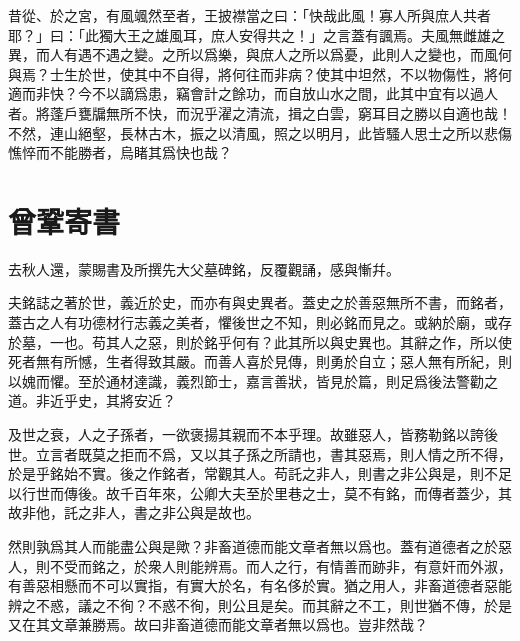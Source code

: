 昔從、於之宮，有風颯然至者，王披襟當之曰：「快哉此風！寡人所與庶人共者耶？」曰：「此獨大王之雄風耳，庶人安得共之！」之言蓋有諷焉。夫風無雌雄之異，而人有遇不遇之變。之所以爲樂，與庶人之所以爲憂，此則人之變也，而風何與焉？士生於世，使其中不自得，將何往而非病？使其中坦然，不以物傷性，將何適而非快？今不以謫爲患，{竊會計之餘功}，而自放山水之間，此其中宜有以過人者。將蓬戶甕牖無所不快，而況乎濯之清流，{揖}之白雲，窮耳目之勝以自適也哉！不然，連山絕壑，長林古木，振之以清風，照之以明月，此皆騷人思士之所以悲傷憔悴而不能勝者，烏睹其爲快也{哉}？ %

\theendnotes

\section[寄歐陽舍人書\quad{\small 曾鞏}]{{\normalsize 曾鞏}\quad 寄書}
去秋人還，蒙賜書及所撰先大父墓碑銘，反覆觀誦，感與慚幷。

夫銘誌之著於世，義近於史，而亦有與史異者。蓋史之於善惡無所不書，而銘者，蓋古之人有功德材行志義之美者，懼後世之不知，則必銘而見之。或納於廟，或存於墓，一也。苟其人之惡，則於銘乎何有？此其所以與史異也。其辭之作，所以使死者無有所憾，生者得致其嚴。而善人喜於見傳，則勇於自立；惡人無有所紀，則以媿而懼。至於通材達識，義烈節士，嘉言善狀，皆見於篇，則足爲後法警勸之道。非近乎史，其將安近？

及世之衰，人之子孫者，一欲褒揚其親而不本乎理。故雖惡人，皆務勒銘以誇後世。立言者既莫之拒而不爲，又以其子孫之所請也，書其惡焉，則人情之所不得，於是乎銘始不實。後之作銘者，常觀其人。苟託之非人，則書之非公與是，則不足以行世而傳後。故千百年來，公卿大夫至於里巷之士，莫不有銘，而傳者蓋少，其故非他，託之非人，書之非公與是故也。

然則孰爲其人而能盡公與是歟？非畜道德而能文章者無以爲也。蓋有道德者之於惡人，則不受而銘之，於衆人則能辨焉。而人之行，有情善而跡非，有意奸而外淑，有善惡相懸而不可以實指，有實大於名，有名侈於實。猶之用人，非畜道德者惡能辨之不惑，議之不徇？不惑不徇，則公且是矣。而其辭之不工，則世猶不傳，於是又在其文章兼勝焉。故曰非畜道德而能文章者無以爲也。豈非然哉？


